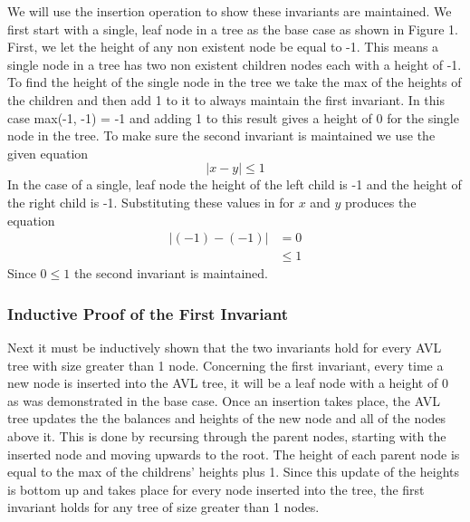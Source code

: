 \documentclass[12pt]{article}
\begin{document}
We will use the insertion operation to show these invariants are maintained. 
We first start with a single, leaf node in a tree as the base case as shown in
Figure 1.  First, we let the height of any non existent node be equal to -1.
This means a single node in a tree has two non existent children nodes each
with a height of -1.  To find the height of the single node in the tree we take the max of the
heights of the children and then add 1 to it to always maintain the first
invariant.  In this case max(-1, -1) = -1 and adding 1 to this result gives a
height of 0 for the single node in the tree.  To make sure the second invariant
is maintained we use the given equation
$$
|x-y| \le 1
$$
In the case of a single, leaf node the height of the left child is
-1 and the height of the right child is -1.  Substituting these values in for
$x$ and $y$ produces the equation
\begin{align*}
|(-1)-(-1)| &= 0\\
&\le 1
\end{align*}
Since $0 \le 1$ the second invariant is maintained.
\subsubsection*{Inductive Proof of the First Invariant}
Next it must be inductively shown that the two invariants hold for every AVL
tree with size greater than 1 node.  Concerning the first invariant, every time
a new node is inserted into the AVL tree, it will be a leaf node with a height
of 0 as was demonstrated in the base case.  Once an insertion takes place, the
AVL tree updates the the balances and heights of the new node and all of the
nodes above it.  This is done by recursing through 
the parent nodes, starting with the inserted node and moving upwards to the
root.  The height of each parent node is equal to the max of
the childrens' heights plus 1.  Since this update of the heights is bottom up
and takes place for every node inserted into the tree, the first invariant holds for any tree of
size greater than 1 nodes.\\
\end{document}
